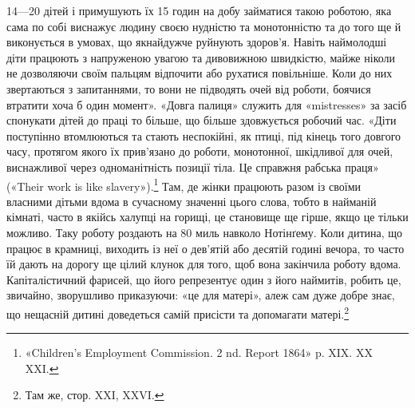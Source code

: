 \parcont{}  %
14—20 дітей і примушують їх 15 годин на добу займатися такою
роботою, яка сама по собі виснажує людину своєю нудністю та
монотонністю та до того ще й виконується в умовах, що якнайдужче
руйнують здоров’я. Навіть наймолодші діти працюють з
напруженою увагою та дивовижною швидкістю, майже ніколи
не дозволяючи своїм пальцям відпочити або рухатися повільніше.
Коли до них звертаються з запитаннями, то вони не підводять очей
від роботи, боячися втратити хоча б один момент». «Довга палиця»
служить для «mistresses» за засіб спонукати дітей до праці то
більше, що більше здовжується робочий час. «Діти поступінно
втомлюються та стають неспокійні, як птиці, під кінець того довгого
часу, протягом якого їх прив’язано до роботи, монотонної, шкідливої
для очей, виснажливої через одноманітність позиції тіла.
Це справжня рабська праця» («Their work is like slavery»).\footnote{
«Children’s Employment Commission. 2 nd. Report 1864» p. XIX.
XX XXI.
}
Там, де жінки працюють разом із своїми власними дітьми вдома
в сучасному значенні цього слова, тобто в найманій кімнаті,
часто в якійсь халупці на горищі, це становище ще гірше, якщо
це тільки можливо. Таку роботу роздають на 80 миль навколо
Нотінґему. Коли дитина, що працює в крамниці, виходить із неї
о дев’ятій або десятій годині вечора, то часто їй дають на дорогу
ще цілий клунок для того, щоб вона закінчила роботу вдома.
Капіталістичний фарисей, що його репрезентує один з його наймитів,
робить це, звичайно, зворушливо приказуючи: «це для
матері», алеж сам дуже добре знає, що нещасній дитині доведеться
самій присісти та допомагати матері.\footnote{
Там же, стор. XXI, XXVI.
}

